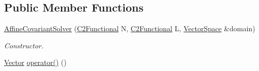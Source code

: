 \subsection*{Public Member Functions}
\begin{DoxyCompactItemize}
\item 
\hyperlink{classSpacy_1_1CompositeStep_1_1AffineCovariantSolver_af81f7894dc2b7ee3533ab67d82195751_af81f7894dc2b7ee3533ab67d82195751}{Affine\+Covariant\+Solver} (\hyperlink{group__SpacyGroup_gaf5b89e117806134b06a1ce4629fb2b65_gaf5b89e117806134b06a1ce4629fb2b65}{C2\+Functional} N, \hyperlink{group__SpacyGroup_gaf5b89e117806134b06a1ce4629fb2b65_gaf5b89e117806134b06a1ce4629fb2b65}{C2\+Functional} L, \hyperlink{classSpacy_1_1VectorSpace}{Vector\+Space} \&domain)
\begin{DoxyCompactList}\small\item\em Constructor. \end{DoxyCompactList}\item 
\hypertarget{classSpacy_1_1CompositeStep_1_1AffineCovariantSolver_a010068164773b4062ec122b253a8226c}{}\hyperlink{classSpacy_1_1Vector}{Vector} \hyperlink{classSpacy_1_1CompositeStep_1_1AffineCovariantSolver_a010068164773b4062ec122b253a8226c}{operator()} ()\label{classSpacy_1_1CompositeStep_1_1AffineCovariantSolver_a010068164773b4062ec122b253a8226c}


\end{DoxyCompactItemize}
